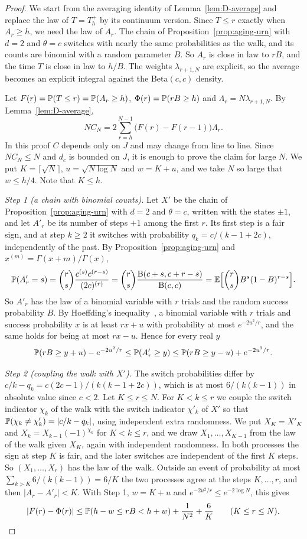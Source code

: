 \begin{proof}
We start from the averaging identity of Lemma~\ref{lem:D-average} and replace
the law of $T=T^+_h$ by its continuum version. Since $T\le r$ exactly when
$A_r\ge h$, we need the law of $A_r$. The chain of
Proposition~\ref{prop:aging-urn} with $d=2$ and $\theta=c$ switches with
nearly the same probabilities as the walk, and its counts are binomial with a
random parameter $B$. So $A_r$ is close in law to $rB$, and the time $T$ is
close in law to $h/B$. The weights $\lambda_{r+1,N}$ are explicit, so the
average becomes an explicit integral against the Beta$(c,c)$ density.

Let $F(r)=\mathbb{P}(T\le r)=\mathbb{P}(A_r\ge h)$, $\Phi(r)=\mathbb{P}(rB\ge h)$ and
$\Lambda_r=N\lambda_{r+1,N}$. By Lemma~\ref{lem:D-average},
\[
NC_N=2\sum_{r=h}^{N-1}\bigl(F(r)-F(r-1)\bigr)\Lambda_r .
\]
In this proof $C$ depends only on $J$ and may change from line to line. Since
$NC_N\le N$ and $d_c$ is bounded on $J$, it is enough to prove the claim for
large $N$. We put $K=\lceil\sqrt N\rceil$, $u=\sqrt{N\log N}$ and $w=K+u$, and
we take $N$ so large that $w\le h/4$. Note that $K\le h$.

\emph{Step 1 (a chain with binomial counts).} Let $X'$ be the chain of
Proposition~\ref{prop:aging-urn} with $d=2$ and $\theta=c$, written with the
states $\pm1$, and let $A'_r$ be its number of steps $+1$ among the first $r$.
Its first step is a fair sign, and at step $k\ge2$ it switches with
probability $q_k=c/(k-1+2c)$, independently of the past. By
Proposition~\ref{prop:aging-urn} and $x^{(m)}=\Gamma(x+m)/\Gamma(x)$,
\[
\mathbb{P}(A'_r=s)=\binom rs\frac{c^{(s)}c^{(r-s)}}{(2c)^{(r)}}
=\binom rs\frac{\mathrm B(c+s,c+r-s)}{\mathrm B(c,c)}
=\mathbb{E}\Bigl[\binom rsB^s(1-B)^{r-s}\Bigr].
\]
So $A'_r$ has the law of a binomial variable with $r$ trials and the random
success probability $B$. By Hoeffding's inequality~\cite[Theorem~1]{hoeffding1963},
a binomial variable with $r$ trials and success probability $x$ is at least
$rx+u$ with probability at most $e^{-2u^2/r}$, and the same holds for being at
most $rx-u$. Hence for every real $y$
\[
\mathbb{P}(rB\ge y+u)-e^{-2u^2/r}\le\mathbb{P}(A'_r\ge y)\le\mathbb{P}(rB\ge y-u)+e^{-2u^2/r}.
\]

\emph{Step 2 (coupling the walk with $X'$).} The switch probabilities differ
by $c/k-q_k=c(2c-1)/(k(k-1+2c))$, which is at most $6/(k(k-1))$ in absolute
value since $c<2$. Let $K\le r\le N$. For $K<k\le r$ we couple the switch
indicator $\chi_k$ of the walk with the switch indicator $\chi'_k$ of $X'$ so
that $\mathbb{P}(\chi_k\ne\chi'_k)=\lvert c/k-q_k\rvert$, using independent extra
randomness. We put $X_K=X'_K$ and $X_k=X_{k-1}(-1)^{\chi_k}$ for $K<k\le r$,
and we draw $X_1,\dots,X_{K-1}$ from the law of the walk given $X_K$, again
with independent randomness. In both processes the sign at step $K$ is fair,
and the later switches are independent of the first $K$ steps. So
$(X_1,\dots,X_r)$ has the law of the walk. Outside an event of probability at
most $\sum_{k>K}6/(k(k-1))=6/K$ the two processes agree at the steps
$K,\dots,r$, and then $\lvert A_r-A'_r\rvert<K$. With Step 1, $w=K+u$ and
$e^{-2u^2/r}\le e^{-2\log N}$, this gives
\[
\lvert F(r)-\Phi(r)\rvert\le\mathbb{P}(h-w\le rB<h+w)+\frac1{N^2}+\frac6K
\qquad(K\le r\le N).
\]


\end{proof}
